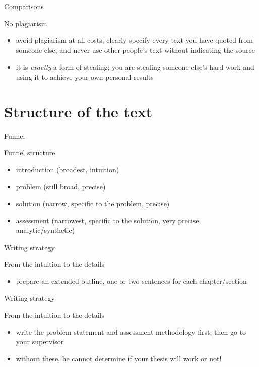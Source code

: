 \documentclass{beamer}
\begin{document}
\begin{frame}{Comparisons}
\begin{block}{No plagiarism}
\begin{itemize}
\item avoid plagiarism at all costs; clearly specify every text you have quoted from someone else, and never use other people's text without indicating the source
\item it is \textit{exactly} a form of stealing; you are stealing someone else's hard work and using it to achieve your own personal results
\end{itemize}
\end{block}
\end{frame}


\section{Structure of the text}
\begin{frame}{Funnel}
\begin{block}{Funnel structure}
\begin{itemize}
\item introduction (broadest, intuition)
\item problem (still broad, precise)
\item solution (narrow, specific to the problem, precise)
\item assessment (narrowest, specific to the solution, very precise, analytic/synthetic)
\end{itemize}
\end{block}
\end{frame}


\begin{frame}{Writing strategy}
\begin{block}{From the intuition to the details}
\begin{itemize}
\item prepare an extended outline, one or two sentences for each chapter/section
\end{itemize}
\end{block}
\end{frame}


\begin{frame}{Writing strategy}
\begin{block}{From the intuition to the details}
\begin{itemize}
\item write the problem statement and assessment methodology first, then go to your supervisor
\item without these, he cannot determine if your thesis will work or not!
\end{itemize}
\end{block}
\end{frame}
\end{document}
